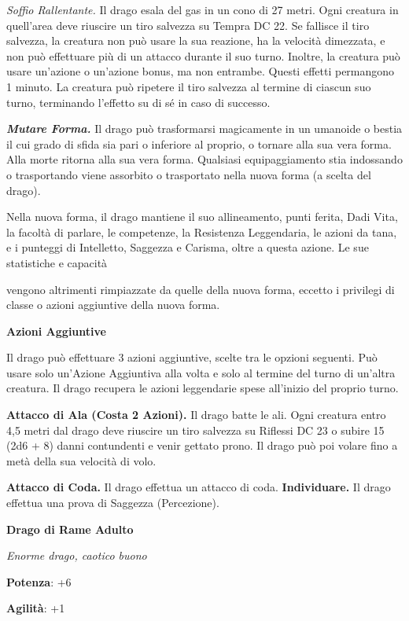\begin{multicols}{2}
\emph{Soffio Rallentante.} Il drago esala del gas in un cono di 27
metri. Ogni creatura in quell'area deve riuscire un tiro salvezza su Tempra DC 22. Se fallisce il tiro salvezza, la creatura non può
usare la sua reazione, ha la velocità dimezzata, e non può effettuare
più di un attacco durante il suo turno. Inoltre, la creatura può usare
un'azione o un'azione bonus, ma non entrambe. Questi effetti permangono
1 minuto. La creatura può ripetere il tiro salvezza al termine di
ciascun suo turno, terminando l'effetto su di sé in caso di successo.

\emph{\textbf{Mutare Forma.}} Il drago può trasformarsi magicamente in
un umanoide o bestia il cui grado di sfida sia pari o inferiore al
proprio, o tornare alla sua vera forma. Alla morte ritorna alla sua vera
forma. Qualsiasi equipaggiamento stia indossando o trasportando viene
assorbito o trasportato nella nuova forma (a scelta del drago).

Nella nuova forma, il drago mantiene il suo allineamento, punti ferita,
Dadi Vita, la facoltà di parlare, le competenze, la Resistenza
Leggendaria, le azioni da tana, e i punteggi di Intelletto, Saggezza e
Carisma, oltre a questa azione. Le sue statistiche e capacità

vengono altrimenti rimpiazzate da quelle della nuova forma, eccetto i
privilegi di classe o azioni aggiuntive della nuova forma.

\textbf{Azioni Aggiuntive}

Il drago può effettuare 3 azioni aggiuntive, scelte tra le opzioni
seguenti. Può usare solo un'Azione Aggiuntiva alla volta e solo al
termine del turno di un'altra creatura. Il drago recupera le azioni
leggendarie spese all'inizio del proprio turno.

\textbf{Attacco di Ala (Costa 2 Azioni).} Il drago batte le ali. Ogni
creatura entro 4,5 metri dal drago deve riuscire un tiro salvezza su Riflessi DC 23 o subire 15 (2d6 + 8) danni contundenti e venir gettato
prono. Il drago può poi volare fino a metà della sua velocità di volo.

\textbf{Attacco di Coda.} Il drago effettua un attacco di coda.
\textbf{Individuare.} Il drago effettua una prova di Saggezza
(Percezione).



\textbf{Drago di Rame Adulto}

\emph{Enorme drago, caotico buono}

\textbf{Potenza}: +6

\textbf{Agilità}: +1


\end{multicols}
